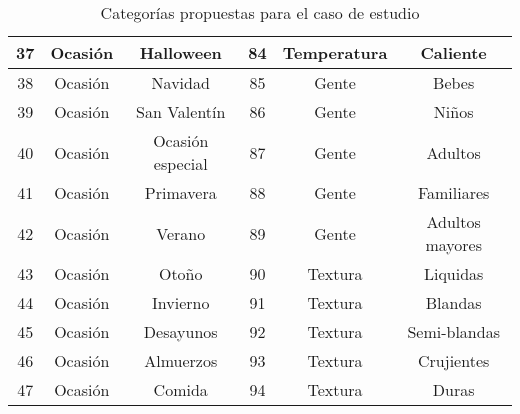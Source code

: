 \begin{table}
\begin{center}
\begin{tabular}{ | c | c | c | c | c | c |}
			\midrule
			37 & Ocasión       & Halloween         & 84 & Temperatura & Caliente                      \\
			\midrule
			38 & Ocasión       & Navidad           & 85 & Gente       & Bebes                         \\
			\midrule
			39 & Ocasión       & San Valentín     & 86 & Gente       & Niños                        \\
			\midrule
			40 & Ocasión       & Ocasión especial & 87 & Gente       & Adultos                       \\
			\midrule
			41 & Ocasión       & Primavera         & 88 & Gente       & Familiares                    \\
			\midrule
			42 & Ocasión       & Verano            & 89 & Gente       & Adultos mayores               \\
			\midrule
			43 & Ocasión       & Otoño            & 90 & Textura     & Liquidas                      \\
			\midrule
			44 & Ocasión       & Invierno          & 91 & Textura     & Blandas                       \\
			\midrule
			45 & Ocasión       & Desayunos         & 92 & Textura     & Semi-blandas                  \\
			\midrule
			46 & Ocasión       & Almuerzos         & 93 & Textura     & Crujientes                    \\
			\midrule
			47 & Ocasión       & Comida            & 94 & Textura     & Duras                         \\
			\bottomrule
		\end{tabular}
		\caption{Categorías propuestas para el caso de estudio}
		\label{table:caracteristicas}
	\end{center}
\end{table}

